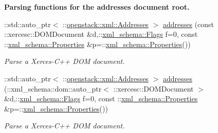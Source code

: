 \begin{Indent}{\bf Parsing functions for the addresses document root.}
\begin{DoxyCompactItemize}
::std::auto\_\-ptr$<$ ::\hyperlink{classopenstack_1_1xml_1_1Addresses}{openstack::xml::Addresses} $>$ \hyperlink{namespaceopenstack_1_1xml_a2475e1930c1de4053636e75b9b7f4102}{addresses} (const ::xercesc::DOMDocument \&d,::\hyperlink{namespacexml__schema_affb4c227cbd9aa7453dd1dc5a1401943}{xml\_\-schema::Flags} f=0, const ::\hyperlink{namespacexml__schema_ad27ce19a7ee1d3b1064092648898f64c}{xml\_\-schema::Properties} \&p=::\hyperlink{namespacexml__schema_ad27ce19a7ee1d3b1064092648898f64c}{xml\_\-schema::Properties}())
\begin{DoxyCompactList}\small\item\em Parse a Xerces-\/C++ DOM document. \item\end{DoxyCompactList}\item 
::std::auto\_\-ptr$<$ ::\hyperlink{classopenstack_1_1xml_1_1Addresses}{openstack::xml::Addresses} $>$ \hyperlink{namespaceopenstack_1_1xml_a5c526e2055dc94503c9ec5e9998d83d5}{addresses} (::xml\_\-schema::dom::auto\_\-ptr$<$ ::xercesc::DOMDocument $>$ \&d,::\hyperlink{namespacexml__schema_affb4c227cbd9aa7453dd1dc5a1401943}{xml\_\-schema::Flags} f=0, const ::\hyperlink{namespacexml__schema_ad27ce19a7ee1d3b1064092648898f64c}{xml\_\-schema::Properties} \&p=::\hyperlink{namespacexml__schema_ad27ce19a7ee1d3b1064092648898f64c}{xml\_\-schema::Properties}())
\begin{DoxyCompactList}\small\item\em Parse a Xerces-\/C++ DOM document. \item\end{DoxyCompactList}\end{DoxyCompactItemize}
\end{Indent}

